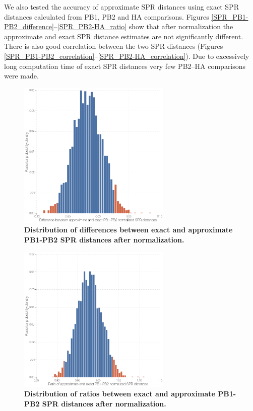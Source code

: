 \documentclass[11pt,oneside,letterpaper]{article}
\begin{document}
We also tested the accuracy of approximate SPR distances using exact SPR distances calculated from PB1, PB2 and HA comparisons.
Figures \ref{SPR_PB1-PB2_difference}--\ref{SPR_PB2-HA_ratio} show that after normalization the approximate and exact SPR distance estimates are not significantly different.
There is also good correlation between the two SPR distances (Figures \ref{SPR_PB1-PB2_correlation}--\ref{SPR_PB2-HA_correlation}). 
Due to excessively long computation time of exact SPR distances very few PB2--HA comparisons were made.

\begin{figure}
\centering  
\includegraphics[width=0.65\textwidth]  {supp_figures/InfB_supp_NormPB1-PB2_hist.png}
\caption{\textbf{Distribution of differences between exact and approximate PB1-PB2 SPR distances after normalization.}}
\label{NormSPR_PB1-PB2_difference}
\end{figure}

\begin{figure}
\centering  
\includegraphics[width=0.65\textwidth]  {supp_figures/InfB_supp_NormPB1-PB2_hist2.png}
\caption{\textbf{Distribution of ratios between exact and approximate PB1-PB2 SPR distances after normalization.}}
\label{NormSPR_PB1-PB2_ratio}
\end{figure}
\end{document}
